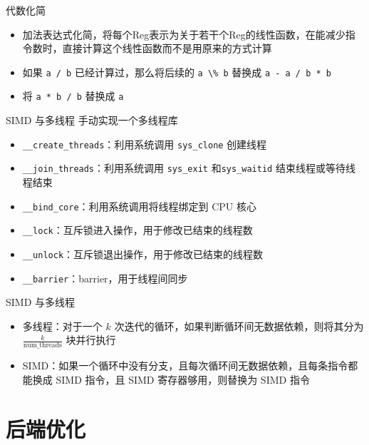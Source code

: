 \documentclass[aspectratio=169,UTF-8]{ctexbeamer}
\begin{document}
		\begin{frame}{代数化简}
			\begin{itemize}
				\item 加法表达式化简，将每个Reg表示为关于若干个Reg的线性函数，在能减少指令数时，直接计算这个线性函数而不是用原来的方式计算
				\item 如果 \lstinline{a / b} 已经计算过，那么将后续的 \lstinline{a \% b} 替换成 \lstinline{a - a / b * b}
				\item 将 \lstinline{a * b / b} 替换成 \lstinline{a}
			\end{itemize}
		\end{frame}
		
		\begin{frame}{SIMD 与多线程}
			手动实现一个多线程库
			
			\begin{itemize}
				\item \lstinline{__create_threads}：利用系统调用 \lstinline{sys_clone} 创建线程
				\item \lstinline{__join_threads}：利用系统调用 \lstinline{sys_exit} 和\lstinline{sys_waitid} 结束线程或等待线程结束
				\item \lstinline{__bind_core}：利用系统调用将线程绑定到 CPU 核心
				\item \lstinline{__lock}：互斥锁进入操作，用于修改已结束的线程数
				\item \lstinline{__unlock}：互斥锁退出操作，用于修改已结束的线程数
				\item \lstinline{__barrier}：barrier，用于线程间同步
			\end{itemize}
			
		\end{frame}
		
		\begin{frame}{SIMD 与多线程}
			\begin{itemize}
				\item 多线程：对于一个 $k$ 次迭代的循环，如果判断循环间无数据依赖，则将其分为 $\frac{k}{\mathrm{num\_threads}}$ 块并行执行
				\item SIMD：如果一个循环中没有分支，且每次循环间无数据依赖，且每条指令都能换成 SIMD 指令，且 SIMD 寄存器够用，则替换为 SIMD 指令
			\end{itemize}

		\end{frame}
	
	\section{后端优化}
	
\end{document}
